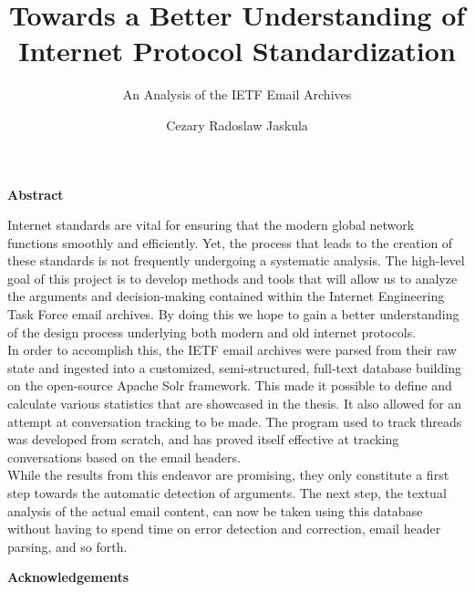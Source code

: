 \documentclass[a4paper,english]{report}
\title{Towards a Better Understanding of Internet
Protocol Standardization}
\subtitle{An Analysis of the IETF Email Archives}
\author{Cezary Radoslaw Jaskula}
\begin{document}
\duoforside[dept={Department of Informatics},
program={Informatics: Programming and System Architecture},
long]




\begin{centering}

\textbf{Abstract}

\end{centering}

\bigskip

Internet standards are vital for ensuring that the modern global network functions smoothly and efficiently. Yet, the process that leads to the creation of these standards is not frequently undergoing a systematic analysis. The high-level goal of this project is to develop methods and tools that will allow us to analyze the arguments and decision-making contained within the Internet Engineering Task Force email archives. By doing this we hope to gain a better understanding of the design process underlying both modern and old internet protocols.\\

In order to accomplish this, the IETF email archives were parsed from their raw state and ingested into a customized, semi-structured, full-text database building on the open-source Apache Solr framework. This made it possible to define and calculate various statistics that are showcased in the thesis. It also allowed for an attempt at conversation tracking to be made. The program used to track threads was developed from scratch, and has proved itself effective at tracking conversations based on the email headers.\\

While the results from this endeavor are promising, they only constitute a first step towards the automatic detection of arguments. The next step, the textual analysis of the actual email content, can now be taken using this database without having to spend time on error detection and correction, email header parsing, and so forth.






\newpage

\newpage

\begin{centering}

\textbf{Acknowledgements}

\end{centering}

\bigskip
\end{document}

